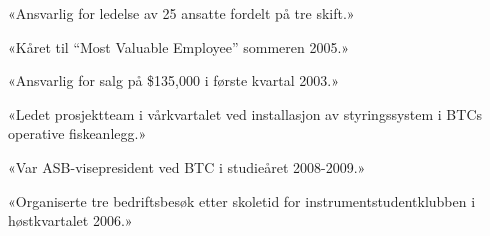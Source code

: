 \vskip 10pt {\narrower \noindent \baselineskip5pt

«Ansvarlig for ledelse av 25 ansatte fordelt på tre skift.»

\vskip 10pt

«Kåret til “Most Valuable Employee” sommeren 2005.»

\vskip 10pt

«Ansvarlig for salg på \$135,000 i første kvartal 2003.»

\vskip 10pt

«Ledet prosjektteam i vårkvartalet ved installasjon av styringssystem i BTCs operative fiskeanlegg.»

\vskip 10pt

«Var ASB-visepresident ved BTC i studieåret 2008-2009.»

\vskip 10pt

«Organiserte tre bedriftsbesøk etter skoletid for instrumentstudentklubben i høstkvartalet 2006.»

\par} \vskip 10pt




